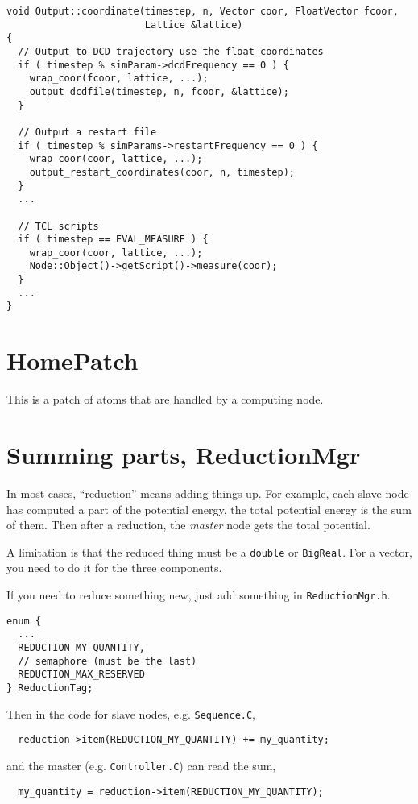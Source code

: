 \documentclass{article}
\begin{document}
\begin{lstlisting}
void Output::coordinate(timestep, n, Vector coor, FloatVector fcoor,
                        Lattice &lattice)
{
  // Output to DCD trajectory use the float coordinates
  if ( timestep % simParam->dcdFrequency == 0 ) {
    wrap_coor(fcoor, lattice, ...);
    output_dcdfile(timestep, n, fcoor, &lattice);
  }

  // Output a restart file
  if ( timestep % simParams->restartFrequency == 0 ) {
    wrap_coor(coor, lattice, ...);
    output_restart_coordinates(coor, n, timestep);
  }
  ...

  // TCL scripts
  if ( timestep == EVAL_MEASURE ) {
    wrap_coor(coor, lattice, ...);
    Node::Object()->getScript()->measure(coor);
  }
  ...
}
\end{lstlisting}


\section{HomePatch}

This is a patch of atoms that are handled by a computing node.
%
%


\section{\label{sec:reduction}Summing parts, ReductionMgr}

In most cases,
``reduction'' means adding things up.
%
For example, each slave node has computed
a part of the potential energy,
the total potential energy is the sum of them.
%
Then after a reduction,
the \emph{master} node gets the total potential.

A limitation is that the reduced thing
must be a \texttt{double} or \texttt{BigReal}.
%
For a vector, you need to do it for the three components.
%

If you need to reduce something new,
just add something in \texttt{ReductionMgr.h}.
\begin{lstlisting}
enum {
  ...
  REDUCTION_MY_QUANTITY,
  // semaphore (must be the last)
  REDUCTION_MAX_RESERVED
} ReductionTag;
\end{lstlisting}
%
Then in the code for slave nodes, e.g. \texttt{Sequence.C},
%
\begin{lstlisting}
  reduction->item(REDUCTION_MY_QUANTITY) += my_quantity;
\end{lstlisting}
%
and the master (e.g. \texttt{Controller.C}) can read the sum,
%
\begin{lstlisting}
  my_quantity = reduction->item(REDUCTION_MY_QUANTITY);
\end{lstlisting}
\end{document}
